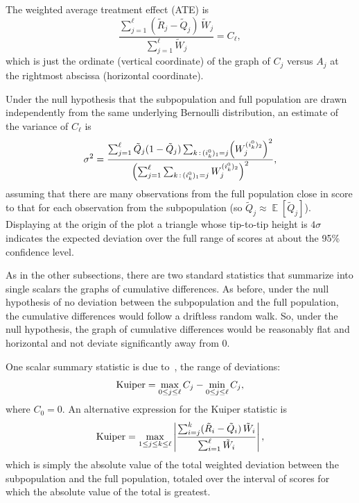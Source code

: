 \documentclass[]{fairmeta}
\DeclareMathOperator{\E}{\mathop{}\mathbb{E}}
\begin{document}
The weighted average treatment effect (ATE) is
%
\begin{equation}
\frac{\sum_{j=1}^{\ell} (\tilde{R}_j - \tilde{Q}_j) \, \tilde{W}_j}
     {\sum_{j=1}^{\ell} \tilde{W}_j} = C_{\ell},
\end{equation}
%
which is just the ordinate (vertical coordinate) of the graph
of $C_j$ versus $A_j$ at the rightmost abscissa (horizontal coordinate).

Under the null hypothesis that the subpopulation and full population are drawn
independently from the same underlying Bernoulli distribution,
an estimate of the variance of $C_{\ell}$ is
%
\begin{equation}
\sigma^2 = \frac{\sum_{j=1}^{\ell} \tilde{Q}_j (1 - \tilde{Q}_j)
                 \sum_{k\,:\,(i_k^0)_1 = j} \Bigl( W_j^{(i_k^0)_2} \Bigr)^2}
{\Bigl( \sum_{j=1}^{\ell} \sum_{k\,:\,(i_k^0)_1 = j} W_j^{(i_k^0)_2} \Bigr)^2},
\end{equation}
%
assuming that there are many observations from the full population
close in score to that for each observation from the subpopulation
(so $\tilde{Q}_j \approx \E[\tilde{Q}_j]$).
Displaying at the origin of the plot a triangle whose tip-to-tip height
is $4\sigma$ indicates the expected deviation over the full range of scores
at about the 95\% confidence level.

As in the other subsections, there are two standard statistics
that summarize into single scalars the graphs of cumulative differences.
As before, under the null hypothesis of no deviation
between the subpopulation and the full population, 
the cumulative differences would follow a driftless random walk.
So, under the null hypothesis, the graph of cumulative differences would be
reasonably flat and horizontal and not deviate significantly away from 0.

One scalar summary statistic is due to~\cite{kuiper}, the range of deviations:
%
\begin{equation}
{\rm Kuiper} = \max_{0 \le j \le \ell} C_j - \min_{0 \le j \le \ell} C_j,
\end{equation}
%
where $C_0 = 0$.
An alternative expression for the Kuiper statistic is
%
\begin{equation}
\label{intuitive_subpop}
{\rm Kuiper} = \max_{1 \le j \le k \le \ell}
\left| \frac{\sum_{i=j}^k (\tilde{R}_i - \tilde{Q}_i) \, \tilde{W}_i}
            {\sum_{i=1}^{\ell} \tilde{W}_i} \right|,
\end{equation}
%
which is simply the absolute value of the total weighted deviation
between the subpopulation and the full population,
totaled over the interval of scores for which the absolute value
of the total is greatest.
\end{document}
